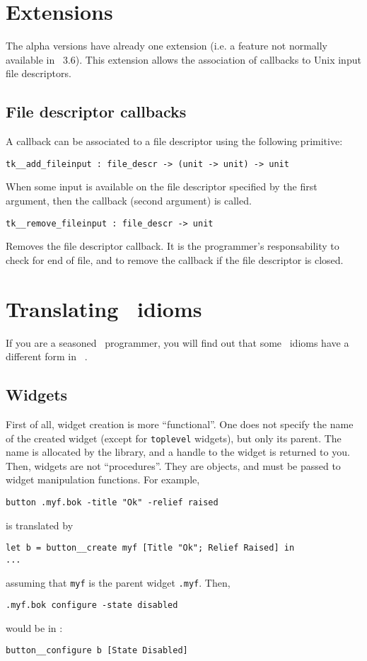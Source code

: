 \section{Extensions}
The alpha versions have already one extension (i.e. a feature not
normally available in \tk\ 3.6). This extension allows the association of
callbacks to Unix input file descriptors. 

\subsection{File descriptor callbacks}
A callback can be associated to a file descriptor using the following
primitive:
\begin{verbatim}
tk__add_fileinput : file_descr -> (unit -> unit) -> unit
\end{verbatim} 
When some input is available on the file descriptor specified by the first
argument, then the callback (second argument) is called.
\begin{verbatim}
tk__remove_fileinput : file_descr -> unit
\end{verbatim} 
Removes the file descriptor callback. It is the programmer's responsability
to check for end of file, and to remove the callback if the file descriptor
is closed.

\section{Translating \tk\ idioms}
If you are a seasoned \tk\ programmer, you will find out that some \tk\
idioms have a different form in \camltk\ .

\subsection{Widgets}
First of all, widget creation is more ``functional''. One does not specify
the name of the created widget (except for \verb|toplevel| widgets), but
only its parent. The name is allocated by the library, and a handle to the
widget is returned to you. Then, widgets are not ``procedures''. They are
objects, and must be passed to widget manipulation functions.
For example,
\begin{verbatim}
button .myf.bok -title "Ok" -relief raised
\end{verbatim} 
is translated by
\begin{verbatim}
let b = button__create myf [Title "Ok"; Relief Raised] in
...
\end{verbatim} 
assuming that \verb|myf| is the parent widget \verb|.myf|.
Then, 
\begin{verbatim}
.myf.bok configure -state disabled
\end{verbatim} 
would be in \caml:
\begin{verbatim}
button__configure b [State Disabled]
\end{verbatim} 

